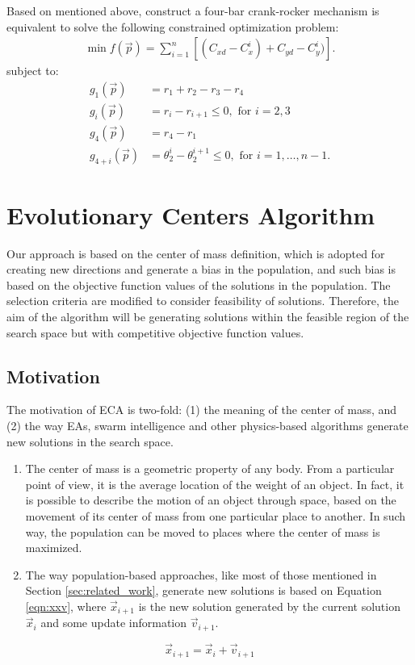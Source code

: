 \documentclass[12pt,letterpape]{article}
\begin{document}
Based on mentioned above, construct a four-bar crank-rocker mechanism is equivalent to solve the following constrained optimization problem:
% 
\begin{align}
	\min f(\vec{p}) = \sum_{i=1}^n \left[ (C_{xd} - C_x^i) + C_{yd} - C_y^i) \right].
\end{align}
% 
subject to: 
% 
\begin{align*}
 g_1( \vec{p})  & = r_1 + r_2 - r_3 - r_4 \\
 g_i(\vec{p})   & = r_i -  r_{i+1} \leq 0, \text{ for } i = 2, 3 \\
 g_4(\vec{p})   & = r_4 - r_1 \\
 g_{4 + i } (\vec{p})   & = \theta_{2}^i - \theta_{2}^{i+1} \leq 0,  \text{ for } i = 1, \ldots, n-1. 
\end{align*}
%

\section{Evolutionary Centers Algorithm} %
\label{sec:evolutionary_centers_algorithm}

Our approach is based on the center of mass definition, which is adopted for 
creating new directions and generate a bias in the population, and such bias is 
based on the objective function values of the solutions in the population. The 
selection criteria are modified to consider feasibility of solutions. Therefore, 
the aim of the algorithm will be generating solutions within the feasible region 
of the search space but with competitive objective function values.

%
%
\subsection{Motivation} %
The motivation of ECA is two-fold: (1) the meaning of the center of mass, and (2) 
the way EAs, swarm intelligence and other physics-based algorithms generate new 
solutions in the search space. 
% 
\begin{enumerate}
	\item The center of mass is a geometric property of any body. From a particular 
		  point of view, it is the average location of the weight of an object. 
		  In fact, it is possible to describe the motion of an object through 
		  space, based on the movement of its center of mass from one particular 
		  place to another. In such way, the population can be moved to places 
		  where the center of mass is maximized. 
	\item The way population-based approaches, like most of those mentioned in 
		  Section \ref{sec:related_work}, generate new solutions is based on 
		  Equation \ref{eqn:xxv}, where $\vec{x}_{i + 1}$ is the new solution 
		  generated by the current solution $\vec{x}_{i}$ and some update 
		  information $\vec{v}_{i + 1}$. 
\end{enumerate}
\begin{equation}
	\vec{x}_{i + 1} = \vec{x}_{i} + \vec{v}_{i + 1}
	\label{eqn:xxv}
\end{equation}
% 
\end{document}
